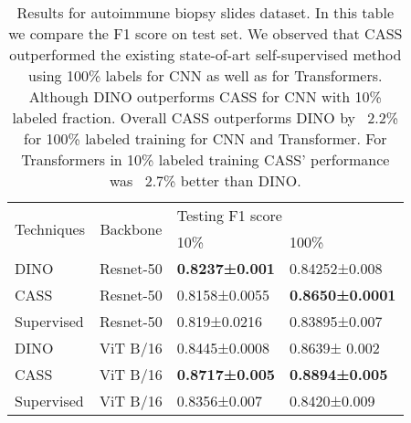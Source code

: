 \begin{table}[!htb]
\centering
\begin{tabular}{llll}
\hline
\multicolumn{1}{c}{\multirow{2}{*}{Techniques}} & \multicolumn{1}{c}{\multirow{2}{*}{Backbone}} & \multicolumn{2}{l}{Testing F1 score} \\
\multicolumn{1}{c}{}                            & \multicolumn{1}{c}{}                           & 10\%       & 100\%         \\
\hline

DINO                                            & Resnet-50                                      & \textbf{0.8237±0.001}            &0.84252±0.008           \\
CASS                                           & Resnet-50                                   & 0.8158±0.0055           & \textbf{0.8650±0.0001}           \\
Supervised                                      & Resnet-50                                 & 0.819±0.0216          &  0.83895±0.007            \\
\hline

DINO                                            & ViT B/16                             & 0.8445±0.0008           &0.8639± 0.002             \\
CASS                                           & ViT B/16                                          & \textbf{0.8717±0.005}           & \textbf{0.8894±0.005}            \\
Supervised                                      & ViT B/16                                          &0.8356±0.007           &0.8420±0.009          \\
\hline
\end{tabular}
\caption{Results for autoimmune biopsy slides dataset. In this table we compare the F1 score on test set. We observed that CASS outperformed the existing state-of-art self-supervised method using 100\% labels for CNN as well as for Transformers. Although DINO outperforms CASS for CNN with 10\% labeled fraction. Overall CASS outperforms DINO by ~2.2\% for 100\% labeled training for CNN and Transformer. For Transformers in 10\% labeled training CASS' performance was ~2.7\% better than DINO.}
\end{table}

